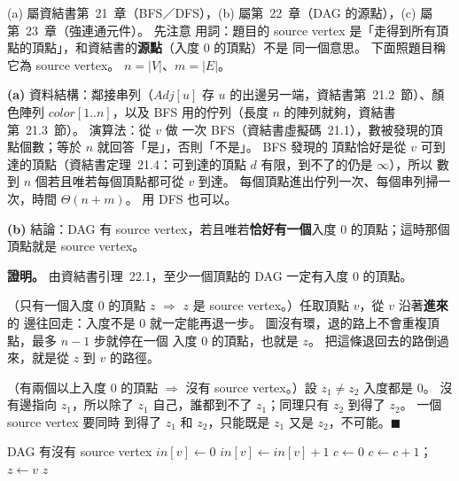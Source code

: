 \begin{pastsoln}
(a) 屬資結書第~21~章（BFS／DFS），(b) 屬第~22~章（DAG 的源點），(c) 屬第~23~章（強連通元件）。 先注意
用詞：題目的 source vertex 是「走得到所有頂點的頂點」，和資結書的\textbf{源點}（入度 $0$ 的頂點）不是
同一個意思。 下面照題目稱它為 source vertex。 $n = |V|$、$m = |E|$。

\textbf{(a)} 資料結構：鄰接串列（$\mathit{Adj}[u]$ 存 $u$ 的出邊另一端，資結書第~21.2~節）、顏色陣列
$\mathit{color}[1..n]$，以及 BFS 用的佇列（長度 $n$ 的陣列就夠，資結書第~21.3~節）。 演算法：從 $v$ 做
一次 BFS（資結書虛擬碼~21.1），數被發現的頂點個數；等於 $n$ 就回答「是」，否則「不是」。 BFS 發現的
頂點恰好是從 $v$ 可到達的頂點（資結書定理~21.4：可到達的頂點 $d$ 有限，到不了的仍是 $\infty$），所以
數到 $n$ 個若且唯若每個頂點都可從 $v$ 到達。 每個頂點進出佇列一次、每個串列掃一次，時間
$\Theta(n + m)$。 用 DFS 也可以。

\textbf{(b)} 結論：DAG 有 source vertex，若且唯若\textbf{恰好有一個}入度 $0$ 的頂點；這時那個頂點就是
source vertex。

\textbf{證明。} 由資結書引理~22.1，至少一個頂點的 DAG 一定有入度 $0$ 的頂點。

（只有一個入度 $0$ 的頂點 $z$ $\Rightarrow$ $z$ 是 source vertex。）任取頂點 $v$，從 $v$ 沿著\textbf{進來}的
邊往回走：入度不是 $0$ 就一定能再退一步。 圖沒有環，退的路上不會重複頂點，最多 $n - 1$ 步就停在一個
入度 $0$ 的頂點，也就是 $z$。 把這條退回去的路倒過來，就是從 $z$ 到 $v$ 的路徑。

（有兩個以上入度 $0$ 的頂點 $\Rightarrow$ 沒有 source vertex。）設 $z_1 \ne z_2$ 入度都是 $0$。 沒有邊指向
$z_1$，所以除了 $z_1$ 自己，誰都到不了 $z_1$；同理只有 $z_2$ 到得了 $z_2$。 一個 source vertex 要同時
到得了 $z_1$ 和 $z_2$，只能既是 $z_1$ 又是 $z_2$，不可能。\hfill$\blacksquare$

\begin{pseudo}{DAG 有沒有 source vertex}
        \State $\mathit{in}[v] \gets 0$
    \EndFor
            \State $\mathit{in}[v] \gets \mathit{in}[v] + 1$
        \EndFor
    \EndFor
    \State $c \gets 0$
            \State $c \gets c + 1$；$z \gets v$
        \EndIf
    \EndFor
        \State \Return $z$ 
    \EndIf
    \State \Return \NIL {}
\EndFunction
\end{pseudo}


\end{pastsoln}
